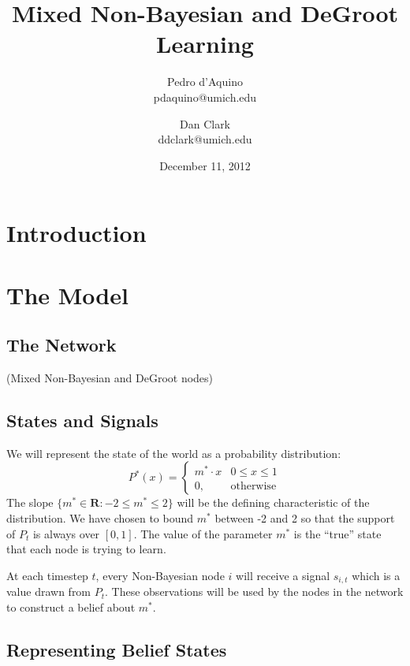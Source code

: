 \documentclass[a4paper,12pt]{article}
\begin{document}
\title{Mixed Non-Bayesian and DeGroot Learning}
\author{Pedro d'Aquino\\pdaquino@umich.edu \and Dan Clark\\ddclark@umich.edu}
\date{December 11, 2012}

\maketitle

\section{Introduction}

\cite{Jadbabaie2012}
\cite{DeGroot1974}

\section{The Model}

\subsection{The Network}

(Mixed Non-Bayesian and DeGroot nodes)

\subsection{States and Signals}

We will represent the state of the world as a probability distribution:
\begin{equation}
P^*(x)=\begin{cases}
m^* \cdot x & 0 \le x \le 1 \\
0, & \text{otherwise}
\end{cases}
\end{equation}
The slope $\{ m^* \in \mathbf{R} : -2 \le m^* \le 2 \}$ will be the defining characteristic of the distribution.  We have chosen to bound $m^*$ between -2 and 2 so that the support of $P_t$  is always over $[0,1]$.  The value of the parameter $m^*$ is the ``true'' state that each node is trying to learn.

At each timestep $t$, every Non-Bayesian node $i$ will receive a signal $s_{i,t}$ which is a value drawn from $P_t$.  These observations will be used by the nodes in the network to construct a belief about $m^*$.

\subsection{Representing Belief States}
\end{document}
